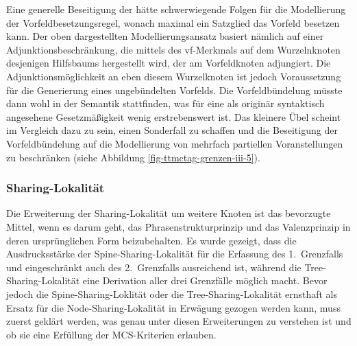 Eine generelle Beseitigung der  hätte schwerwiegende Folgen für die Modellierung der Vorfeldbesetzungsregel, wonach maximal ein Satzglied das Vorfeld besetzen kann. Der oben dargestellten Modellierungsansatz basiert nämlich auf einer Adjunktionsbeschränkung, die mittels des {\sc vf}-Merkmals auf dem Wurzelnknoten desjenigen Hilfsbaums hergestellt wird, der am Vorfeldknoten adjungiert. Die Adjunktionsmöglichkeit an eben diesem Wurzelknoten ist jedoch Voraussetzung für die Generierung eines ungebündelten Vorfelds. Die Vorfeldbündelung müsste dann wohl in der Semantik stattfinden, was für eine als originär syntaktisch angesehene Gesetzmä\ss igkeit wenig erstrebenswert ist. Das kleinere Übel scheint im Vergleich dazu zu sein, einen Sonderfall zu schaffen und die Beseitigung der Vorfeldbündelung auf die Modellierung von mehrfach partiellen Voranstellungen zu beschränken (siehe Abbildung \ref{fig-ttmctag-grenzen-iii-5}). 


\subsubsection{Sharing-Lokalität}

Die Erweiterung der Sharing-Lokalität um weitere Knoten ist das bevorzugte Mittel, wenn es darum geht, das Phrasenstrukturprinzip und das Valenzprinzip in deren ursprünglichen Form beizubehalten. Es wurde gezeigt, dass die Ausdrucksstärke der Spine-Sharing-Lokalität für die Erfassung des 1.~Grenzfalls und eingeschränkt auch des 2.~Grenzfalls ausreichend ist, während die Tree-Sharing-Lokalität eine Derivation aller drei Grenzfälle möglich macht. Bevor jedoch die Spine-Sharing-Loklität oder die Tree-Sharing-Lokalität ernsthaft als Ersatz für die Node-Sharing-Lokalität in Erwägung gezogen werden kann, muss zuerst geklärt werden, was genau unter diesen Erweiterungen zu verstehen ist und ob sie eine Erfüllung der MCS-Kriterien erlauben.\largerpage%

